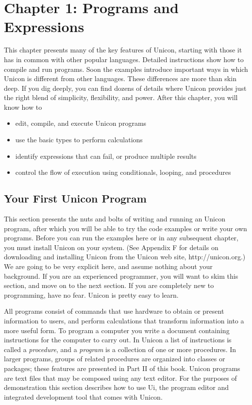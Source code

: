 \clearpage
\section{Chapter 1: Programs and Expressions}

This chapter presents many of the key features of
Unicon, starting with those it has in common with other popular
languages. Detailed instructions show how to compile
and run programs. Soon the examples introduce
important ways in which Unicon is different from other languages. These
differences are more than skin deep. If you dig deeply, you can find
dozens of details where Unicon provides just the right blend of
simplicity, flexibility, and power.
After this chapter, you will know how to

\begin{itemize} \itemsep 0pt
\item edit, compile, and execute Unicon programs
\item use the basic types to perform calculations
\item identify expressions that can fail, or
produce multiple results
\item control the flow of execution using conditionals, looping, and
procedures
\end{itemize}

\subsection{Your First Unicon Program}

This section presents the nuts and bolts of writing and running an
Unicon program, after which you will be able to try
the code examples or write your own programs. Before you can run the
examples here or in any subsequent chapter, you must
install Unicon on your system. (See Appendix F for
details on downloading and installing Unicon from the Unicon web site,
http://unicon.org.) We are going to be very explicit here,
and assume nothing about your background. If you are an experienced
programmer, you will want to skim this section, and move on to the next
section. If you are completely new to programming, have no fear. Unicon
is pretty easy to learn.

All programs consist of commands that use hardware to obtain or present
information to users, and perform calculations that transform
information into a more useful form. To program a
computer you write a document containing instructions for the computer
to carry out. In Unicon a list of instructions is called
a \textit{procedure}, and a
\textit{program} is a collection of one or more
procedures. In larger programs, groups of related procedures are
organized into classes or packages; these features are presented in
Part II of this book. Unicon programs are text files that may be
composed using any text editor. For the purposes of
demonstration this section describes how to use Ui, the
program editor and integrated development tool that comes with Unicon.

